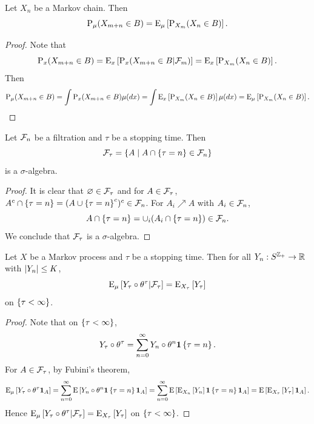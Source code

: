 \begin{corollary}
    Let $X_n$ be a Markov chain. Then 
    \begin{equation*}
        \operatorname{P}_\mu(X_{m+n}\in B) = \operatorname{E}_\mu\left[ {\operatorname{P}_{X_m}(X_n\in B)} \right]. 
    \end{equation*}
\end{corollary}
\begin{proof}
    Note that 
    \begin{equation*}
        \operatorname{P}_x(X_{m+n}\in B) = \operatorname{E}_x\left[ {\operatorname{P}_x(X_{m+n}\in B|\mathcal{F}_m)} \right] = \operatorname{E}_x\left[ {\operatorname{P}_{X_m}(X_n\in B)} \right].
    \end{equation*}
    Then
    \begin{equation*}
        \operatorname{P}_\mu(X_{m+n}\in B) = \int \operatorname{P}_x(X_{m+n}\in B)\mu(dx) = \int \operatorname{E}_x\left[ {\operatorname{P}_{X_m}(X_n\in B)} \right]\mu(dx) = \operatorname{E}_\mu\left[ {\operatorname{P}_{X_m}(X_n\in B)} \right].
    \end{equation*}
\end{proof}

\begin{proposition}
    Let $\mathcal{F}_n$ be a filtration and $\tau$ be a stopping time. 
    Then 
    \begin{equation*}
        \mathcal{F}_\tau = \left\{ A \;\middle\vert\; A\cap\left\{ {\tau = n} \right\}\in\mathcal{F}_n \right\}
    \end{equation*}
    is a $\sigma$-algebra. 
\end{proposition}
\begin{proof}
    It is clear that $\varnothing\in\mathcal{F}_\tau$ and for 
    $A\in\mathcal{F}_\tau$, $A^c\cap\left\{ {\tau = n} \right\} 
    = (A\cup\left\{ {\tau = n} \right\}^c)^c\in\mathcal{F}_n$. For $A_i\nearrow A$ 
    with $A_i\in\mathcal{F}_n$, 
    \begin{equation*}
        A\cap\left\{ {\tau = n} \right\} = \cup_i(A_i\cap\left\{ {\tau = n} \right\})\in\mathcal{F}_n.
    \end{equation*}
    We conclude that $\mathcal{F}_\tau$ is a $\sigma$-algebra. 
\end{proof}

\begin{theorem}
    Let $X$ be a Markov process and $\tau$ be a stopping time. 
    Then for all $Y_n:S^{\mathbb{Z}_+}\to\mathbb{R}$ with $\left\lvert {Y_n} \right\rvert\leq K$, 
    \begin{equation*}
        \operatorname{E}_\mu\left[ {Y_\tau\circ\theta^\tau|\mathcal{F}_\tau} \right] = \operatorname{E}_{X_\tau}\left[ {Y_\tau} \right]
    \end{equation*}
    on $\left\{ {\tau<\infty} \right\}$. 
\end{theorem}
\begin{proof}
    Note that on $\left\{ {\tau<\infty} \right\}$, 
    \begin{equation*}
        Y_\tau\circ\theta^\tau = \sum_{n=0}^\infty Y_n\circ\theta^n\mathbf{1}\left\{ {\tau = n} \right\}. 
    \end{equation*}
    For $A\in\mathcal{F}_\tau$, by Fubini's theorem, 
    \begin{equation*}
        \operatorname{E}_\mu\left[ {Y_\tau\circ\theta^\tau\mathbf{1}_A} \right] 
        = \sum_{n=0}^\infty\operatorname{E}\left[ {Y_n\circ\theta^n\mathbf{1}\left\{ {\tau = n} \right\}\mathbf{1}_A} \right] 
        = \sum_{n=0}^\infty\operatorname{E}\left[ {\operatorname{E}_{X_n}\left[ {Y_n} \right]\mathbf{1}\left\{ {\tau = n} \right\}\mathbf{1}_A} \right] 
        = \operatorname{E}\left[ {\operatorname{E}_{X_\tau}\left[ {Y_\tau} \right]\mathbf{1}_A} \right].
    \end{equation*}
    Hence $\operatorname{E}_\mu\left[ {Y_\tau\circ\theta^\tau|\mathcal{F}_\tau} \right] = \operatorname{E}_{X_\tau}\left[ {Y_\tau} \right]$ 
    on $\left\{ {\tau<\infty} \right\}$. 
\end{proof}